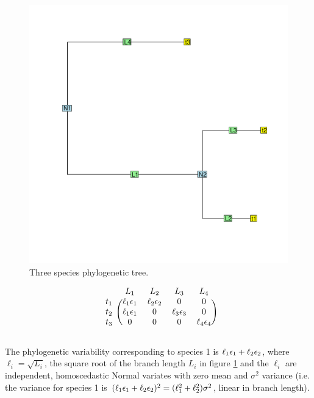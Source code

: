\documentclass[12pt]{article}
\begin{document}
\begin{center}
\begin{figure}[h]
  \includegraphics[scale=0.8,page=1]{./git_push/tree.pdf}
  \caption{Three species phylogenetic tree.}
\label{fig:tree}
\end{figure}
\end{center}

\[
\begin{blockarray}{ccccc}
 & L_1 & L_2 & L_3 & L_4  \\
\begin{block}{c(cccc)}
  t_1 & \ell_1 \e_1 & \ell_2 \e_2 & 0           & 0 \\
  t_2 & \ell_1 \e_1 &  0          & \ell_3 \e_3 & 0 \\
  t_3 & 0           &  0          & 0           & \ell_4 \e_4 \\
\end{block}
\end{blockarray}
 \]

The phylogenetic variability corresponding to species 1 is $\ell_1 { \epsilon}_1 + \ell_2 { \epsilon}_2$, where $\ell_i = \sqrt{L_i}$, the square root of the branch length $L_i$ in figure \ref{fig:tree} and the $\ell_i$ are independent, homoscedastic Normal variates with zero mean and $\sigma^2$ variance (i.e. the variance for species 1 is $(\ell_1 { \epsilon}_1 + \ell_2 { \epsilon}_2)^2 = (\ell_1^2 + \ell_2^2)\sigma^2$, linear in branch length). 
\end{document}
